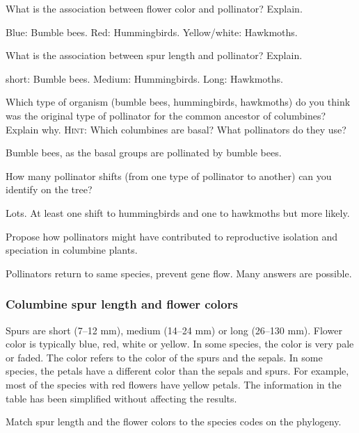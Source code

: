 \documentclass[12pt, hidelinks]{exam}
\newcommand*\AnswerBox[2]{%
    \parbox[t][#1]{0.92\textwidth}{%
    \begin{solution}#2\end{solution}}
    \vspace{\stretch{1}}
}
\begin{document}
\begin{questions}

\question
What is the association between flower color and pollinator? Explain.

\AnswerBox{2\baselineskip}{Blue: Bumble bees. Red: Hummingbirds. Yellow/white: Hawkmoths.}

\question
What is the association between spur length and pollinator? Explain.

\AnswerBox{2\baselineskip}{short: Bumble bees. Medium: Hummingbirds. Long: Hawkmoths.}


\question
Which type of organism (bumble bees, hummingbirds, hawkmoths) do you think was the original type of pollinator for the common ancestor of columbines? Explain why. \textsc{Hint:} Which columbines are basal? What pollinators do they use?

\AnswerBox{2\baselineskip}{Bumble bees, as the basal groups are pollinated by bumble bees.}

\question
How many pollinator shifts (from one type of pollinator to another) can you identify on the tree? 

\AnswerBox{2\baselineskip}{Lots. At least one shift to hummingbirds and one to hawkmoths but more likely.}

\question
Propose how pollinators might have contributed to reproductive isolation and speciation in columbine plants.

\AnswerBox{3\baselineskip}{Pollinators return to same species, prevent gene flow. Many answers are possible.}

\end{questions}

\newpage

\subsubsection*{Columbine spur length and flower colors}

Spurs are short (7--12 mm), medium (14--24 mm) or long (26--130 mm).  
Flower color is typically blue, red, white or yellow. In some species,
the color is very pale or faded. The color refers to the color of the
spurs and the sepals. In some species, the petals have a different color
than the sepals and spurs. For example, most of the species with red
flowers have yellow petals. The information in the table has been simplified
without affecting the results.

Match spur length and the flower colors to the species codes on the phylogeny.
\end{document}

